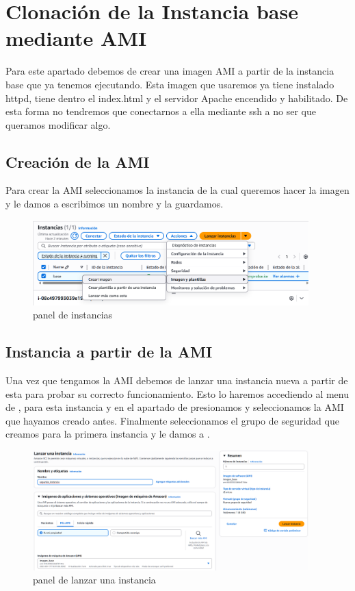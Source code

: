 \documentclass{article}
\begin{document}
\newpage


\section{Clonación de la Instancia base mediante AMI}

	Para este apartado debemos de crear una imagen AMI a partir de la instancia base que ya tenemos ejecutando. Esta imagen que usaremos ya tiene instalado httpd, tiene dentro el index.html y el servidor Apache encendido y habilitado. De esta forma no tendremos que conectarnos a ella mediante ssh a no ser que queramos modificar algo.

\subsection{Creación de la AMI}

	Para crear la AMI seleccionamos la instancia de la cual queremos hacer la imagen y le damos a  escribimos un nombre y la guardamos.

	

	\begin{figure}[H]
	\centering
	\includegraphics[width=0.95\textwidth]{crear_imagen.png}
	\caption{panel de instancias}
	\end{figure}

\subsection{Instancia a partir de la AMI}
	Una vez que tengamos la AMI debemos de lanzar una instancia nueva a partir de esta para probar su correcto funcionamiento. Esto lo haremos accediendo al menu de , para esta instancia y en el apartado de  presionamos  y seleccionamos la AMI que hayamos creado antes. Finalmente seleccionamos el grupo de seguridad que creamos para la primera instancia y le damos a .

	
	\begin{figure}[H]
	\centering
	\includegraphics[width=0.95\textwidth]{menu_lanzar_desde_imagen.png}
	\caption{panel de lanzar una instancia}
	\end{figure}
\end{document}
